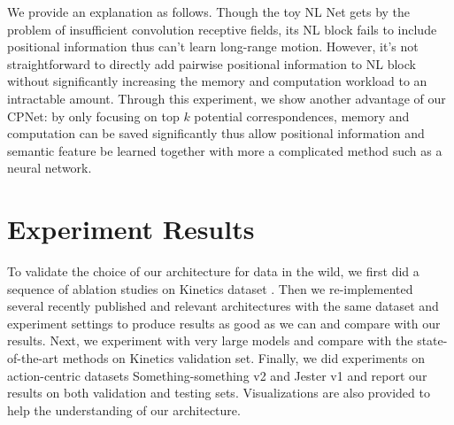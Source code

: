 \documentclass[10pt,twocolumn,letterpaper]{article}
\begin{document}
We provide an explanation as follows. Though the toy NL Net gets by the problem of insufficient convolution receptive fields, its NL block fails to include positional information thus can't learn long-range motion. 
However, it's not straightforward to directly add pairwise positional information to NL block without significantly increasing the memory and computation workload to an intractable amount.
Through this experiment, we show another advantage of our CPNet: by only focusing on top $k$ potential correspondences, memory and computation can be saved significantly thus allow positional information and semantic feature be learned together with more a complicated method such as a neural network.


\section{Experiment Results}

To validate the choice of our architecture for data in the wild, we first did a sequence of ablation studies on Kinetics dataset \cite{Kinetics}. 
Then we re-implemented several recently published and relevant architectures with the same dataset and experiment settings to produce results as good as we can and compare with our results. 
Next, we experiment with very large models and compare with the state-of-the-art methods on Kinetics validation set.
Finally, we did experiments on action-centric datasets Something-something v2 \cite{Something:Something} and Jester v1 \cite{Jester} and report our results on both validation and testing sets. Visualizations are also provided to help the understanding of our architecture.
\end{document}
